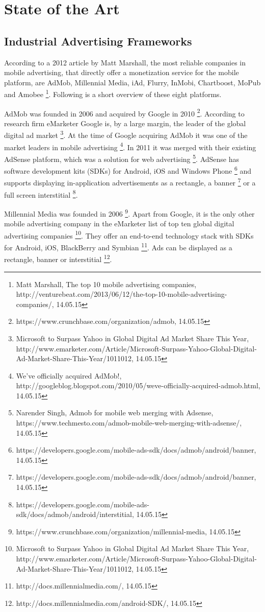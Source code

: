 \chapter{State of the Art}

\section{Industrial Advertising Frameworks}

According to a 2012 article by Matt Marshall, the most reliable companies in mobile advertising, that directly offer a monetization service for the mobile platform, are AdMob, Millennial Media, iAd, Flurry, InMobi, Chartboost, MoPub and Amobee \footnote[2]{Matt Marshall, The top 10 mobile advertising companies, http://venturebeat.com/2013/06/12/the-top-10-mobile-advertising-companies/, 14.05.15}. Following is a short overview of these eight platforms.

AdMob was founded in 2006 and acquired by Google in 2010 \footnote[3]{https://www.crunchbase.com/organization/admob, 14.05.15}. According to research firm eMarketer Google is, by a large margin, the leader of the global digital ad market \footnote[4]{Microsoft to Surpass Yahoo in Global Digital Ad Market Share This Year, http://www.emarketer.com/Article/Microsoft-Surpass-Yahoo-Global-Digital-Ad-Market-Share-This-Year/1011012, 14.05.15}. At the time of Google acquiring AdMob it was one of the market leaders in mobile advertising \footnote[5]{We’ve officially acquired AdMob!, http://googleblog.blogspot.com/2010/05/weve-officially-acquired-admob.html, 14.05.15}. In 2011 it was merged with their existing AdSense platform, which was a solution for web advertising \footnote[6]{Narender Singh, Admob for mobile web merging with Adsense, https://www.techmesto.com/admob-mobile-web-merging-with-adsense/, 14.05.15}. AdSense has software development kits (SDKs) for Android, iOS and Windows Phone \footnote[7]{https://developers.google.com/mobile-ads-sdk/docs/admob/android/banner, 14.05.15}  and supports displaying in-application advertisements as a rectangle, a banner \footnote[8]{https://developers.google.com/mobile-ads-sdk/docs/admob/android/banner, 14.05.15}
or a full screen interstitial \footnote[9]{https://developers.google.com/mobile-ads-sdk/docs/admob/android/interstitial, 14.05.15}.

Millennial Media was founded in 2006 \footnote[10]{https://www.crunchbase.com/organization/millennial-media, 14.05.15}. Apart from Google, it is the only other mobile advertising company in the eMarketer list of top ten global digital advertising companies \footnote[11]{Microsoft to Surpass Yahoo in Global Digital Ad Market Share This Year, http://www.emarketer.com/Article/Microsoft-Surpass-Yahoo-Global-Digital-Ad-Market-Share-This-Year/1011012, 14.05.15}. They offer an end-to-end technology stack with SDKs for Android, iOS, BlackBerry and Symbian \footnote[12]{http://docs.millennialmedia.com/, 14.05.15}. Ads can be displayed as a rectangle, banner or interstitial \footnote[13]{http://docs.millennialmedia.com/android-SDK/, 14.05.15}.

